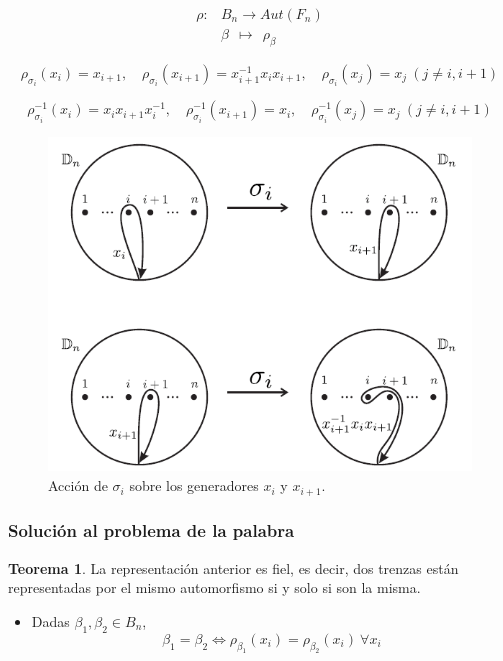\documentclass{beamer}
\theoremstyle{definition}
\newtheorem{teorema}{Teorema}
\begin{document}
\begin{frame}
\begin{align*}
\rho: & B_n \to Aut(F_n)\\
      & \beta\ \ \mapsto\ \ \rho_\beta
\end{align*}

$$\rho_{\sigma_i}(x_i)=x_{i+1},\quad \rho_{\sigma_i}(x_{i+1})=x_{i+1}^{-1}x_ix_{i+1},\quad \rho_{\sigma_i}(x_j)=x_j\ (j\neq i,i+1)$$

$$\rho^{-1}_{\sigma_i}(x_i)=x_ix_{i+1}x_i^{-1},\quad \rho^{-1}_{\sigma_i}(x_{i+1})=x_i,\quad \rho^{-1}_{\sigma_i}(x_j)=x_j\ (j\neq i,i+1)$$
\end{frame}

\begin{frame}
\begin{figure}[h!]
\includegraphics[scale=0.5]{Imagenes/auto.png}
\caption{Acción de $\sigma_i$ sobre los generadores $x_i$ y $x_{i+1}$.}
\end{figure}
\end{frame}

\begin{frame}
\frametitle{Solución al problema de la palabra}
\begin{teorema}
La representación anterior es fiel, es decir, dos trenzas están representadas por el mismo automorfismo si y solo si son la misma.
\end{teorema}

\begin{itemize}
\item Dadas $\beta_1,\beta_2\in B_n$, 
$$\beta_1=\beta_2\Leftrightarrow \rho_{\beta_1}(x_i)=\rho_{\beta_2}(x_i)\ \forall x_i$$
\end{itemize}
\end{frame}
\end{document}
